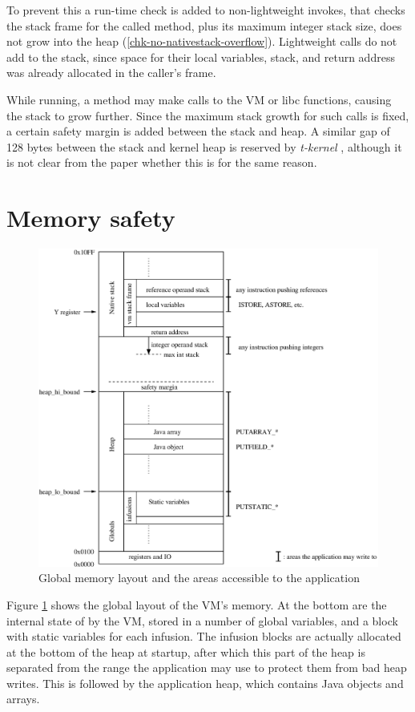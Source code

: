 To prevent this a run-time check is added to non-lightweight invokes, that checks the stack frame for the called method, plus its maximum integer stack size, does not grow into the heap (\ref{chk-no-nativestack-overflow}). Lightweight calls do not add to the stack, since space for their local variables, stack, and return address was already allocated in the caller's frame.

While running, a method may make calls to the VM or libc functions, causing the stack to grow further. Since the maximum stack growth for such calls is fixed, a certain safety margin is added between the stack and heap. A similar gap of 128 bytes between the stack and kernel heap is reserved by \emph{t-kernel} \cite{Gu:2005un}, although it is not clear from the paper whether this is for the same reason.

\section{Memory safety}

\begin{figure}
\includegraphics[width=\linewidth]{memlayout.eps}
\caption{Global memory layout and the areas accessible to the application}
\label{fig-memlayout}
\end{figure}

Figure \ref{fig-memlayout} shows the global layout of the VM's memory. At the bottom are the internal state of by the VM, stored in a number of global variables, and a block with static variables for each infusion. The infusion blocks are actually allocated at the bottom of the heap at startup, after which this part of the heap is separated from the range the application may use to protect them from bad heap writes. This is followed by the application heap, which contains Java objects and arrays.

